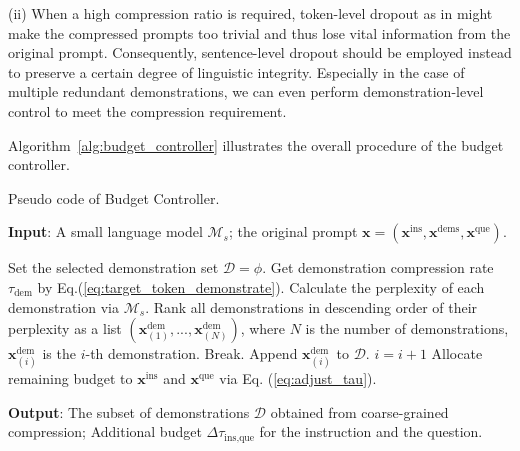 (ii) When a high compression ratio is required, token-level dropout as in \citet{li2023unlocking} might make the compressed prompts too trivial and thus lose vital information from the original prompt.
Consequently, sentence-level dropout should be employed instead to preserve a certain degree of linguistic integrity.
Especially in the case of multiple redundant demonstrations, we can even perform demonstration-level control to meet the compression requirement.

Algorithm~\ref{alg:budget_controller} illustrates the overall procedure of the budget controller.


\begin{algorithm}[t]
    \small
	\caption{Pseudo code of Budget Controller.} 
    \textbf{Input}: A small language model $\mathcal{M}_{s}$; the original prompt $\bm{x} = (\bm{x}^{\text{ins}}, \bm{x}^{\text{dems}}, \bm{x}^{\text{que}})$. %
	\begin{algorithmic}[1]
          \State Set the selected demonstration set $\mathcal{D}=\phi$. %
         \State Get demonstration compression rate $\tau_{\text{dem}}$ by Eq.(\ref{eq:target_token_demonstrate}).
         \State Calculate the perplexity of each demonstration via $\mathcal{M}_s$.
         \State Rank all demonstrations in descending order of their perplexity as a list $(\bm{x}^{\text{dem}}_{(1)}, ..., \bm{x}^{\text{dem}}_{(N)})$, where $N$ is the number of demonstrations, $\bm{x}^{\text{dem}}_{(i)}$ is the $i$-th demonstration.
         \State Break.
         \EndIf
         \State Append $\bm{x}_{(i)}^{\text{dem}}$ to $\mathcal{D}$.
         \State $i = i + 1$
         \EndFor
         \State Allocate remaining budget to $\bm{x}^{\text{ins}}$ and $\bm{x}^{\text{que}}$ via Eq. (\ref{eq:adjust_tau}).
	\end{algorithmic} 
    \textbf{Output}: The subset of demonstrations $\mathcal{D}$ obtained from coarse-grained compression; Additional budget $\Delta\tau_{\text{ins}, \text{que}}$ for the instruction and the question.
    \label{alg:budget_controller}
\end{algorithm}

